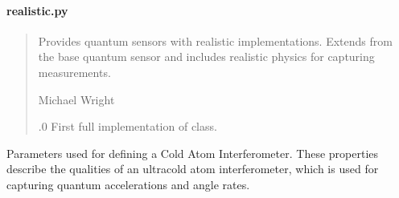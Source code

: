 \documentclass[letterpaper,10pt,english]{sphinxmanual}
\begin{document}
\paragraph{realistic.py}
\label{\detokenize{modules/quantum/realistic:realistic-py}}\begin{quote}\begin{description}
\sphinxAtStartPar
Provides quantum sensors with realistic implementations.
Extends from the base quantum sensor and includes realistic
physics for capturing measurements.

\sphinxAtStartPar
Michael Wright \sphinxhyphen{} 

.0 \sphinxhyphen{} First full implementation of class.

\end{description}\end{quote}

\begin{fulllineitems}
\label{\detokenize{modules/quantum/realistic:qnav.quantum.realistic.ColdAtomInterferometer}}
\pysigstartsignatures
{}
\pysigstopsignatures
\sphinxAtStartPar
Parameters used for defining a Cold Atom Interferometer.
These properties describe the qualities of an ultra\sphinxhyphen{}cold atom
interferometer, which is used for capturing quantum
accelerations and angle rates.

\end{fulllineitems}
\end{document}
